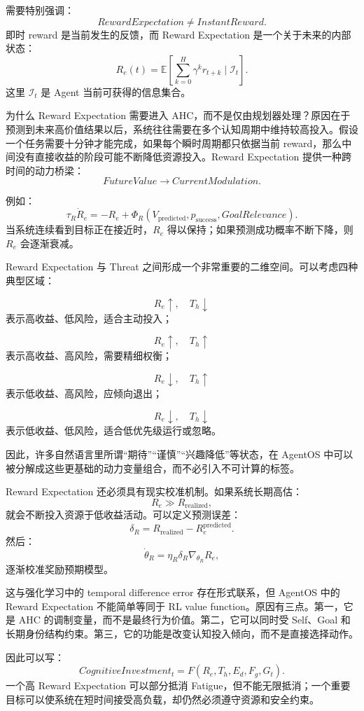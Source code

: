 需要特别强调：
\[
\boxed{
RewardExpectation
\neq
InstantReward.
}
\]
即时 reward 是当前发生的反馈，而 Reward Expectation 是一个关于未来的内部状态：
\[
R_e(t)
=
\mathbb E
\left[
\sum_{k=0}^{H}
\gamma^k r_{t+k}
\mid
\mathcal I_t
\right].
\]
这里 \(\mathcal I_t\) 是 Agent 当前可获得的信息集合。

为什么 Reward Expectation 需要进入 AHC，而不是仅由规划器处理？原因在于预测到未来高价值结果以后，系统往往需要在多个认知周期中维持较高投入。假设一个任务需要十分钟才能完成，如果每个瞬时周期都只依据当前 reward，那么中间没有直接收益的阶段可能不断降低资源投入。Reward Expectation 提供一种跨时间的动力桥梁：
\[
FutureValue
\rightarrow
CurrentModulation.
\]

例如：
\[
\tau_R\dot R_e
=
-R_e
+
\Phi_R(
V_{\mathrm{predicted}},
p_{\mathrm{success}},
GoalRelevance
).
\]
当系统连续看到目标正在接近时，\(R_e\) 得以保持；如果预测成功概率不断下降，则 \(R_e\) 会逐渐衰减。

Reward Expectation 与 Threat 之间形成一个非常重要的二维空间。可以考虑四种典型区域：

\[
R_e\uparrow,\quad T_h\downarrow
\]
表示高收益、低风险，适合主动投入；

\[
R_e\uparrow,\quad T_h\uparrow
\]
表示高收益、高风险，需要精细权衡；

\[
R_e\downarrow,\quad T_h\uparrow
\]
表示低收益、高风险，应倾向退出；

\[
R_e\downarrow,\quad T_h\downarrow
\]
表示低收益、低风险，适合低优先级运行或忽略。

因此，许多自然语言里所谓“期待”“谨慎”“兴趣降低”等状态，在 AgentOS 中可以被分解成这些更基础的动力变量组合，而不必引入不可计算的标签。

Reward Expectation 还必须具有现实校准机制。如果系统长期高估：
\[
R_e \gg R_{\mathrm{realized}},
\]
就会不断投入资源于低收益活动。可以定义预测误差：
\[
\delta_R
=
R_{\mathrm{realized}}
-
R_e^{\mathrm{predicted}}.
\]
然后：
\[
\dot{\theta}_R
=
\eta_R\delta_R\nabla_{\theta_R}R_e,
\]
逐渐校准奖励预期模型。

这与强化学习中的 temporal difference error 存在形式联系，但 AgentOS 中的 Reward Expectation 不能简单等同于 RL value function。原因有三点。第一，它是 AHC 的调制变量，而不是最终行为价值。第二，它可以同时受 Self、Goal 和长期身份结构约束。第三，它的功能是改变认知投入倾向，而不是直接选择动作。

因此可以写：
\[
CognitiveInvestment_t
=
F(
R_e,
T_h,
E_d,
F_g,
G_t
).
\]
一个高 Reward Expectation 可以部分抵消 Fatigue，但不能无限抵消；一个重要目标可以使系统在短时间接受高负载，却仍然必须遵守资源和安全约束。

